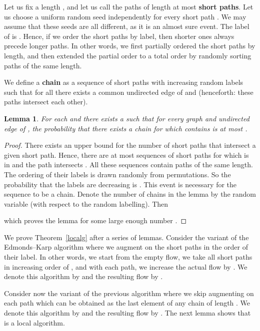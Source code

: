 \documentclass[12pt,a4paper]{article}
\newtheorem{Lemma}[Theorem]{Lemma}
\renewcommand{\:}{\colon}
\begin{document}
Let us fix a length , and let us call the paths of length at most  \textbf{short paths}.
Let us choose a uniform random seed  independently for every short path . 
We may assume that these seeds are all different, as it is an almost sure event. 
The label of  is . 
Hence, if we order the short paths by label, then shorter ones always precede longer paths. 
In other words, we first partially ordered the short paths by length, and then extended the partial order to a total order by randomly sorting paths of the same length. 

We define a \textbf{chain} as a sequence  of short paths with increasing random labels such that for all  there exists a common undirected edge of  and  (henceforth: these paths intersect each other). 

\begin{Lemma} \label{spread}
For each  and  there exists a  such that for every graph  and undirected edge  of , the probability that there exists a chain  for which  contains  is at most .
\end{Lemma}

\begin{proof}
There exists an upper bound  for the number of short paths that intersect a given short path. 
Hence, there are at most  sequences of short paths  for which  is in  and  the path  intersects . 
All these sequences contain  paths of the same length. 
The ordering of their labels is drawn randomly from  permutations. 
So the probability that the labels are decreasing is . This event is necessary for the sequence to be a chain. Denote the number of chains in the lemma by the random variable  (with respect to the random labelling). Then 


which proves the lemma for some large enough number .
\end{proof}

We prove Theorem~\ref{localg} after a series of lemmas. 
Consider the variant of the Edmonds--Karp algorithm where we augment on the short paths in the order of their label. In other words, we start from the empty flow, we take all short paths  in increasing order of , and with each path, we increase the actual flow  by . 
We denote this algorithm by  and the resulting flow by .

Consider now the variant of the previous algorithm where we skip augmenting on each path which can be obtained as the last element of any chain of length . 
We denote this algorithm by  and the resulting flow by . The next lemma shows that  is a local algorithm.
\end{document}
